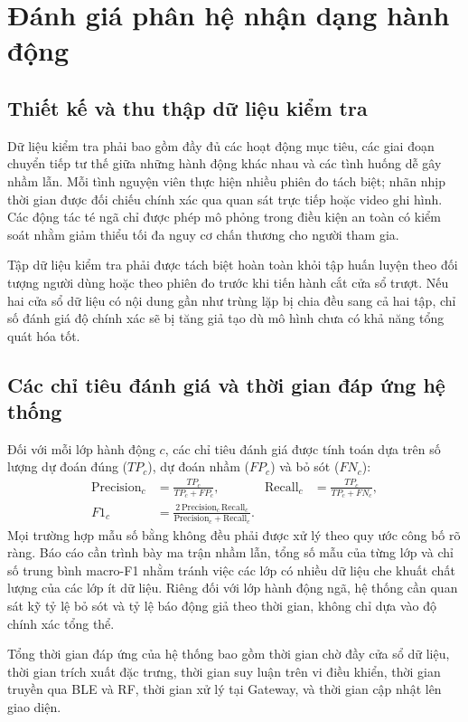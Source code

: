 \section{Đánh giá phân hệ nhận dạng hành động}
\subsection{Thiết kế và thu thập dữ liệu kiểm tra}
Dữ liệu kiểm tra phải bao gồm đầy đủ các hoạt động mục tiêu, các giai đoạn chuyển tiếp tư thế giữa những hành động khác nhau và các tình huống dễ gây nhầm lẫn. Mỗi tình nguyện viên thực hiện nhiều phiên đo tách biệt; nhãn nhịp thời gian được đối chiếu chính xác qua quan sát trực tiếp hoặc video ghi hình. Các động tác té ngã chỉ được phép mô phỏng trong điều kiện an toàn có kiểm soát nhằm giảm thiểu tối đa nguy cơ chấn thương cho người tham gia.

Tập dữ liệu kiểm tra phải được tách biệt hoàn toàn khỏi tập huấn luyện theo đối tượng người dùng hoặc theo phiên đo trước khi tiến hành cắt cửa sổ trượt. Nếu hai cửa sổ dữ liệu có nội dung gần như trùng lặp bị chia đều sang cả hai tập, chỉ số đánh giá độ chính xác sẽ bị tăng giả tạo dù mô hình chưa có khả năng tổng quát hóa tốt.

\subsection{Các chỉ tiêu đánh giá và thời gian đáp ứng hệ thống}
Đối với mỗi lớp hành động $c$, các chỉ tiêu đánh giá được tính toán dựa trên số lượng dự đoán đúng ($TP_c$), dự đoán nhầm ($FP_c$) và bỏ sót ($FN_c$):
\begin{align}
\mathrm{Precision}_c&=\frac{TP_c}{TP_c+FP_c}, &
\mathrm{Recall}_c&=\frac{TP_c}{TP_c+FN_c},\\
F1_c&=\frac{2\,\mathrm{Precision}_c\,\mathrm{Recall}_c}{\mathrm{Precision}_c+\mathrm{Recall}_c}.
\end{align}
Mọi trường hợp mẫu số bằng không đều phải được xử lý theo quy ước công bố rõ ràng. Báo cáo cần trình bày ma trận nhầm lẫn, tổng số mẫu của từng lớp và chỉ số trung bình macro-F1 nhằm tránh việc các lớp có nhiều dữ liệu che khuất chất lượng của các lớp ít dữ liệu. Riêng đối với lớp hành động ngã, hệ thống cần quan sát kỹ tỷ lệ bỏ sót và tỷ lệ báo động giả theo thời gian, không chỉ dựa vào độ chính xác tổng thể.

Tổng thời gian đáp ứng của hệ thống bao gồm thời gian chờ đầy cửa sổ dữ liệu, thời gian trích xuất đặc trưng, thời gian suy luận trên vi điều khiển, thời gian truyền qua BLE và RF, thời gian xử lý tại Gateway, và thời gian cập nhật lên giao diện.

